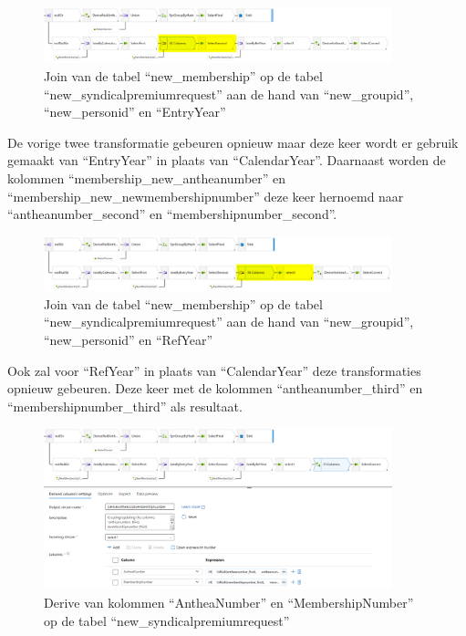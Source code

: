 \begin{figure}[H]
    \centering
    \includegraphics[width=0.9\textwidth]{./graphics/adf/member_5.png}
    \caption{Join van de tabel ``new\_membership'' op de tabel ``new\_syndicalpremiumrequest'' aan de hand van ``new\_groupid'', ``new\_personid'' en ``EntryYear''}
\end{figure}

De vorige twee transformatie gebeuren opnieuw maar deze keer wordt er gebruik gemaakt van ``EntryYear'' in plaats van ``CalendarYear''. Daarnaast worden de kolommen ``membership\_new\_antheanumber'' en ``membership\_new\_newmembershipnumber'' deze keer hernoemd naar ``antheanumber\_second'' en ``membershipnumber\_second''.

\begin{figure}[H]
    \centering
    \includegraphics[width=0.9\textwidth]{./graphics/adf/member_6.png}
    \caption{Join van de tabel ``new\_membership'' op de tabel ``new\_syndicalpremiumrequest'' aan de hand van ``new\_groupid'', ``new\_personid'' en ``RefYear''}
\end{figure}

Ook zal voor ``RefYear'' in plaats van ``CalendarYear'' deze transformaties opnieuw gebeuren. Deze keer met de kolommen ``antheanumber\_third'' en ``membershipnumber\_third'' als resultaat.

\begin{figure}[H]
    \centering
    \includegraphics[width=0.9\textwidth]{./graphics/adf/member_7.png}
    \caption{Derive van kolommen ``AntheaNumber'' en ``MembershipNumber'' op de tabel ``new\_syndicalpremiumrequest''}
\end{figure}

